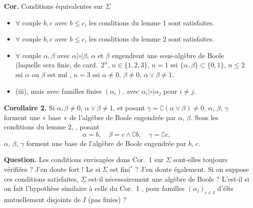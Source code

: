 \documentclass[11pt,a4paper]{article}
\begin{document}
\textbf{Cor.} Conditions équivalentes sur $\Sigma$
\begin{itemize}
  \item[(i)] $\forall$ couple $b, c$ avec $b \le c$, les conditions du lemme 1 sont satisfaites.
  \item[(ii)] $\forall$ couple $b, c$ avec $b \le c$, les conditions  du lemme 2 sont satisfaites.
  \item[(iii)] $\forall$ couple $\alpha, \beta$ avec $\alpha \mathbin{|\circ|} \beta$, $\alpha$ et $\beta$ engendrent une sous-algèbre de Boole (laquelle sera  finie, de card.\ $2^n$,  $n \in \{1,2,3\}$, $n = 1$ ssi $\{\alpha, \beta\} \subset \{0,1\}$, $n \le 2$ ssi $\alpha$ ou $\beta$ est nul  \struck{\ill{}}, $n = 3$ ssi $\alpha \ne 0$, $\beta \ne 0$, $\alpha \vee \beta \ne 1$.
  \item[(iiii)]   (iii), mais avec familles finies $(\alpha_i)$, avec $\alpha_i \mathbin{|\circ|} \alpha_j$ pour $i \ne j$.
\end{itemize}


\textbf{Corollaire 2.} Si $\alpha, \beta \ne 0$, $\alpha \vee \beta \ne 1$, et posant $\gamma = \complement(\alpha \vee \beta) \ne 0$, $\alpha$, $\beta$, $\gamma$ forment une « base » de l'algèbre de Boole engendrée par $\alpha$, $\beta$. Sous les conditions du lemme 2, , posant
\[
  \alpha = b, \quad \beta = c \wedge \complement b, \quad \gamma = \complement c ,
\]
$\alpha$, $\beta$, $\gamma$ forment une base de l'algèbre de Boole engendrée par $b$, $c$.

\textbf{Question.} Les conditions envisagées dans  Cor.\ 1 sur $\Sigma$ sont-elles toujours vérifiées ? J'en doute fort ! Le  si $\Sigma$ est fini$^*$ ? J'en doute également. Si on suppose ces conditions satisfaites, $\Sigma$ est-il nécessairement une algèbre de Boole ? L'est-il si on fait l'hypothèse similaire à celle du Cor.\ 1 , pour  familles $(\alpha_i)_{i \in I}$ d'élts mutuellement disjoints de $I$ (pas  finies) ?
\end{document}
